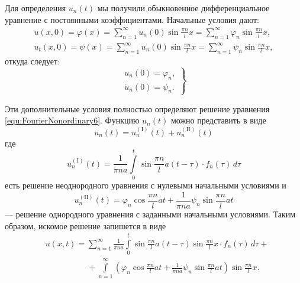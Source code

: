 Для определения $u_n(t)$ мы получили обыкновенное дифференциальное уравнение с постоянными коэффициентами. Начальные условия дают:
\begin{align*}
	u(x, 0) = \varphi(x) = \sum\limits_{n = 1}^\infty u_n(0) \sin \frac{\pi n}{l} x = \sum\limits_{n = 1}^\infty \varphi_n \sin \frac{\pi n}{l} x,\\
	u_t(x, 0) = \psi(x) = \sum\limits_{n = 1}^\infty \dot u_n(0) \sin \frac{\pi n}{l} x = \sum\limits_{n = 1}^\infty \psi_n \sin \frac{\pi n}{l} x,
\end{align*}
откуда следует:
\begin{equation}
	\left.
	\begin{aligned}
		u_n(0) = \varphi_n,\\
		\dot u_n(0) = \psi_n.
	\end{aligned}
	\right\}
	\label{equ:FourierNonordinary7}
\end{equation}

Эти дополнительные условия полностью определяют решение уравнения \eqref{equ:FourierNonordinary6}. Функцию $u_n(t)$ можно представить в виде
\[
	u_n(t) = u_n^{(\mathrm{I})} (t) + u_n^{(\mathrm{II})} (t) 
\]
где
\begin{equation}
	u_n^{(\mathrm{I})} (t) = \frac{1}{\pi n a} \int\limits_0^t \sin \frac{\pi n}{l} a (t - \tau) \cdot f_n (\tau)\, d\tau
	\label{equ:FourierNonordinary8}
\end{equation}
есть решение неоднородного уравнения с нулевыми начальными условиями и 
\begin{equation}
	u_n^{(\mathrm{II})} (t) = \varphi_n \cos \frac{\pi n}{l} at + \frac{1}{\pi n a}\psi_n \sin \frac{\pi n}{l} a t
	\label{equ:FourierNonordinary9}
\end{equation}
--- решение однородного уравнения с заданными начальными условиями. Таким образом, искомое решение запишется в виде
\begin{align*}
	&u(x, t) = \sum\limits_{n = 1}^\infty \frac{1}{\pi n a} \int\limits_0^t \sin \frac{\pi n}{l} a (t - \tau) \sin \frac{\pi n}{l}x \cdot f_n(\tau)\, d\tau + \\
	&\phantom{u(x, t) =} + \int\limits_{n = 1}^\infty \left(\varphi_n \cos \frac{\pi n}{l} a t + \frac{1}{\pi n a} \psi_n \sin \frac{\pi n}{l} a t \right) \sin \frac{\pi n}{l}x.
\end{align*}

